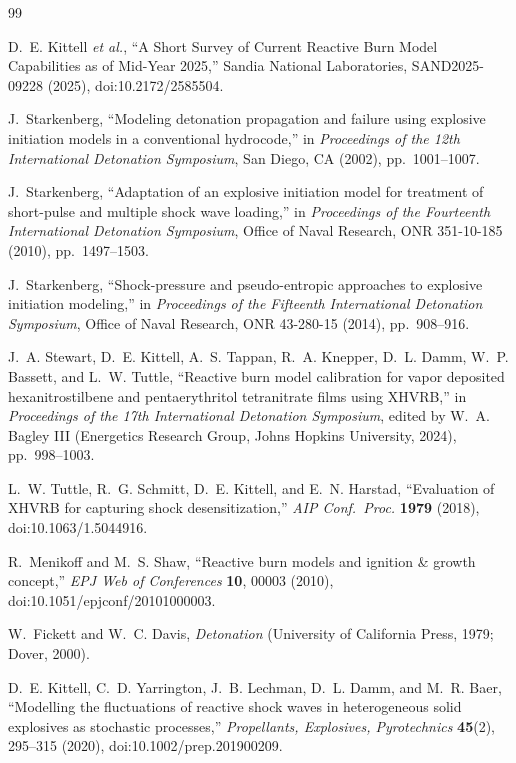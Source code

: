\begin{thebibliography}{99}

D.~E. Kittell \emph{et al.}, ``A Short Survey of Current Reactive Burn
Model Capabilities as of Mid-Year 2025,'' Sandia National Laboratories,
SAND2025-09228 (2025), doi:10.2172/2585504.

J.~Starkenberg, ``Modeling detonation propagation and failure using
explosive initiation models in a conventional hydrocode,'' in
\emph{Proceedings of the 12th International Detonation Symposium}, San
Diego, CA (2002), pp.~1001--1007.

J.~Starkenberg, ``Adaptation of an explosive initiation model for treatment
of short-pulse and multiple shock wave loading,'' in \emph{Proceedings of
the Fourteenth International Detonation Symposium}, Office of Naval
Research, ONR 351-10-185 (2010), pp.~1497--1503.

J.~Starkenberg, ``Shock-pressure and pseudo-entropic approaches to
explosive initiation modeling,'' in \emph{Proceedings of the Fifteenth
International Detonation Symposium}, Office of Naval Research, ONR
43-280-15 (2014), pp.~908--916.

J.~A. Stewart, D.~E. Kittell, A.~S. Tappan, R.~A. Knepper, D.~L. Damm,
W.~P. Bassett, and L.~W. Tuttle, ``Reactive burn model calibration for
vapor deposited hexanitrostilbene and pentaerythritol tetranitrate films
using XHVRB,'' in \emph{Proceedings of the 17th International Detonation
Symposium}, edited by W.~A. Bagley III (Energetics Research Group, Johns
Hopkins University, 2024), pp.~998--1003.

L.~W. Tuttle, R.~G. Schmitt, D.~E. Kittell, and E.~N. Harstad,
``Evaluation of XHVRB for capturing shock desensitization,'' \emph{AIP
Conf.\ Proc.} \textbf{1979} (2018), doi:10.1063/1.5044916.

R.~Menikoff and M.~S. Shaw, ``Reactive burn models and ignition \& growth
concept,'' \emph{EPJ Web of Conferences} \textbf{10}, 00003 (2010),
doi:10.1051/epjconf/20101000003.

W.~Fickett and W.~C. Davis, \emph{Detonation} (University of California
Press, 1979; Dover, 2000).

D.~E. Kittell, C.~D. Yarrington, J.~B. Lechman, D.~L. Damm, and M.~R.
Baer, ``Modelling the fluctuations of reactive shock waves in heterogeneous
solid explosives as stochastic processes,'' \emph{Propellants, Explosives,
Pyrotechnics} \textbf{45}(2), 295--315 (2020), doi:10.1002/prep.201900209.


\end{thebibliography}
